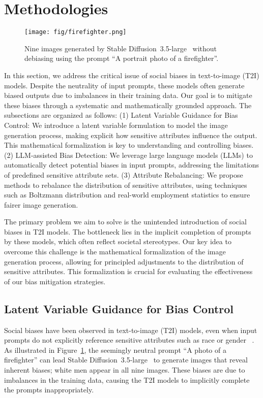 \section{Methodologies}
\label{sec:method}
\begin{figure}[t]
    \centering
    \texttt{[image: fig/firefighter.png]}
    \caption{Nine images generated by Stable Diffusion~3.5-large~\cite{sd3} without debiasing using the prompt ``A portrait photo of a firefighter''.}
    \label{fig:firefighter}
\end{figure}

In this section, we address the critical issue of social biases in text-to-image (T2I) models. Despite the neutrality of input prompts, these models often generate biased outputs due to imbalances in their training data. Our goal is to mitigate these biases through a systematic and mathematically grounded approach. The subsections are organized as follows: (1) Latent Variable Guidance for Bias Control: We introduce a latent variable formulation to model the image generation process, making explicit how sensitive attributes influence the output. This mathematical formalization is key to understanding and controlling biases. (2) LLM-assisted Bias Detection: We leverage large language models (LLMs) to automatically detect potential biases in input prompts, addressing the limitations of predefined sensitive attribute sets. (3) Attribute Rebalancing: We propose methods to rebalance the distribution of sensitive attributes, using techniques such as Boltzmann distribution and real-world employment statistics to ensure fairer image generation.

The primary problem we aim to solve is the unintended introduction of social biases in T2I models. The bottleneck lies in the implicit completion of prompts by these models, which often reflect societal stereotypes. Our key idea to overcome this challenge is the mathematical formalization of the image generation process, allowing for principled adjustments to the distribution of sensitive attributes. This formalization is crucial for evaluating the effectiveness of our bias mitigation strategies.

\subsection{Latent Variable Guidance for Bias Control}
\label{sec:latent_variable_guidance}
Social biases have been observed in text-to-image (T2I) models, even when input prompts do not explicitly reference sensitive attributes such as race or gender ~\cite{bianchi2023easily}. 
As illustrated in Figure~\ref{fig:firefighter}, the seemingly neutral prompt ``A photo of a firefighter'' can lead Stable Diffusion~3.5-large~\cite{sd3} to generate images that reveal inherent biases; white men appear in all nine images. These biases are due to imbalances in the training data, causing the T2I models to implicitly complete the prompts inappropriately.

